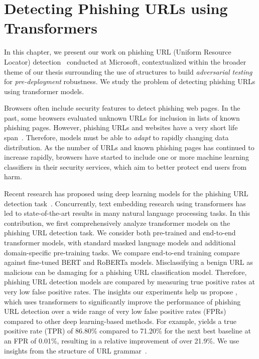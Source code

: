 \chapter{Detecting Phishing URLs using Transformers}
\label{chp:urltran}

In this chapter, we present our work on phishing URL (Uniform Resource Locator) detection~\citep{maneriker2021urltran} conducted at Microsoft, contextualized within the broader theme of our thesis surrounding the use of structures to build \textit{adversarial testing} for \textit{pre-deployment} robustness. 
We study the problem of detecting phishing URLs using transformer models.

Browsers often include security features to detect phishing web pages. 
In the past, some browsers evaluated unknown URLs for inclusion in lists of known phishing pages.
However, phishing URLs and websites have a very short life span~\citep{garera2007framework,chu2013protect}. 
Therefore, models must be able to \textit{adapt} to rapidly changing data distribution.
As the number of URLs and known phishing pages has continued to increase rapidly, browsers have started to include one or more machine learning classifiers in their security services, which aim to better protect end users from harm.

Recent research has proposed using deep learning models for the phishing URL detection task~\cite{sahoo2017malicious,yerima2020high,ren2019bidirectional,peng2019joint,huang2019phishing,tajaddodianfar2020texception}.
Concurrently, text embedding research using transformers has led to state-of-the-art results in many natural language processing tasks.
In this contribution, we first comprehensively analyze transformer models on the phishing URL detection task.
We consider both pre-trained and end-to-end transformer models, with standard masked language models and additional domain-specific pre-training tasks.
We compare end-to-end training compare against fine-tuned BERT and RoBERTa models.
Misclassifying a benign URL as malicious can be damaging for a phishing URL classification model.%
Therefore, phishing URL detection models are compared by measuring true positive rates at very low false positive rates.
 The insights our experiments help us propose \URLTranSys, which uses transformers to significantly improve the performance of phishing URL detection over a wide range of very low false positive rates (FPRs) compared to other deep learning-based methods.
For example, \URLTranSys yields a true positive rate (TPR) of 86.80\% compared to 71.20\% for the next best baseline at an FPR of 0.01\%, resulting in a relative improvement of over 21.9\%.
We use insights from the structure of URL grammar~\cite{rfc3986}.


